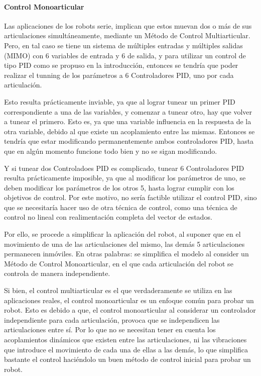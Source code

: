 \documentclass{article}
\begin{document}
\begin{sloppypar}
\paragraph{Control Monoarticular}
\label{sec:Control Monoarticular}
\hfill

Las aplicaciones de los robots serie, implican que estos muevan dos o más de sus articulaciones simultáneamente, mediante un Método de Control Multiarticular. Pero, en tal caso se tiene un sistema de múltiples entradas y múltiples salidas (MIMO) con 6 variables de entrada y 6 de salida, y para utilizar un control de tipo PID como se propuso en la introducción, entonces se tendría que poder realizar el tunning de los parámetros a 6 Controladores PID, uno por cada articulación.

Esto resulta prácticamente inviable, ya que al lograr tunear un primer PID correspondiente a una de las variables, y comenzar a tunear otro, hay que volver a tunear el primero. Esto es, ya que una variable influencia en la respuesta de la otra variable, debido al que existe un acoplamiento entre las mismas. Entonces se tendría que estar modificando permanentemente ambos controladores PID, hasta que en algún momento funcione todo bien y no se sigan modificando.

Y si tunear dos Controladoes PID es complicado, tunear 6 Controladores PID resulta prácticamente imposible, ya que al modificar los parámetros de uno, se deben modificar los parámetros de los otros 5, hasta lograr cumplir con los objetivos de control.
Por este motivo, no sería factible utilizar el control PID, sino que se necesitaría hacer uso de otra técnica de control, como una técnica de control no lineal con realimentación completa del vector de estados.

Por ello, se procede a simplificar la aplicación del robot, al suponer que en el movimiento de una de las articulaciones del mismo, las demás 5 articulaciones permanecen inmóviles. En otras palabras: se simplifica el modelo al consider un Método de Control Monoarticular, en el que cada articulación del robot se controla de manera independiente.

Si bien, el control multiarticular es el que verdaderamente se utiliza en las aplicaciones reales, el control monoarticular es un enfoque común para probar un robot. Esto es debido a que, el control monoarticular al considerar un controlador independiente para cada articulación, provoca que se independicen las articulaciones entre sí. Por lo que no se necesitan tener en cuenta los acoplamientos dinámicos que existen entre las articulaciones, ni las vibraciones que introduce el movimiento de cada una de ellas a las demás, lo que simplifica bastante el control haciéndolo un buen método de control inicial para probar un robot.


\end{sloppypar}
\end{document}
